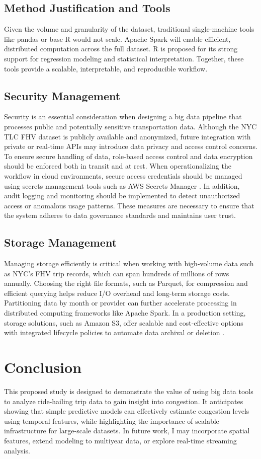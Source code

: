 \documentclass[12pt,letterpaper]{article}
\begin{document}
\subsection{Method Justification and Tools}
Given the volume and granularity of the dataset, traditional single-machine tools like pandas or base R would not scale. Apache Spark will enable efficient, distributed computation across the full dataset. R is proposed for its strong support for regression modeling and statistical interpretation. Together, these tools provide a scalable, interpretable, and reproducible workflow.

\subsection{Security Management}
Security is an essential consideration when designing a big data pipeline that processes public and potentially sensitive transportation data. Although the NYC TLC FHV dataset is publicly available and anonymized, future integration with private or real-time APIs may introduce data privacy and access control concerns. To ensure secure handling of data, role-based access control and data encryption should be enforced both in transit and at rest. When operationalizing the workflow in cloud environments, secure access credentials should be managed using secrets management tools such as AWS Secrets Manager \cite{awsSecretsManager2025}. In addition, audit logging and monitoring should be implemented to detect unauthorized access or anomalous usage patterns. These measures are necessary to ensure that the system adheres to data governance standards and maintains user trust.

\subsection{Storage Management}
Managing storage efficiently is critical when working with high-volume data such as NYC's FHV trip records, which can span hundreds of millions of rows annually. Choosing the right file formats, such as Parquet, for compression and efficient querying helps reduce I/O overhead and long-term storage costs. Partitioning data by month or provider can further accelerate processing in distributed computing frameworks like Apache Spark. In a production setting, storage solutions, such as Amazon S3, offer scalable and cost-effective options with integrated lifecycle policies to automate data archival or deletion \cite{awsS3}.

\section{Conclusion}
This proposed study is designed to demonstrate the value of using big data tools to analyze ride-hailing trip data to gain insight into congestion. It anticipates showing that simple predictive models can effectively estimate congestion levels using temporal features, while highlighting the importance of scalable infrastructure for large-scale datasets. In future work, I may incorporate spatial features, extend modeling to multiyear data, or explore real-time streaming analysis.



\end{document}
